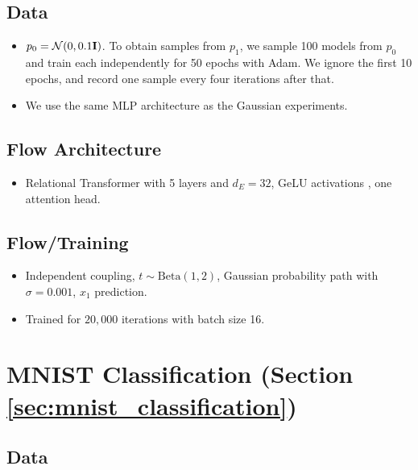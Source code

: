 \subsection*{Data}

\begin{itemize}
    \item $p_0 = \mathcal{N}(0, 0.1 \mathbf{I})$. To obtain samples from $p_1$, we sample 100 models from $p_0$ and train each independently for 50 epochs with Adam. We ignore the first 10 epochs, and record one sample every four iterations after that. 
    \item We use the same MLP architecture as the Gaussian experiments. 
\end{itemize}

{\color{orange}\subsection*{Flow Architecture}
\begin{itemize}
    \item Relational Transformer \citep{diaoRelationalAttentionGeneralizing2023,kofinasGraphNeuralNetworks2024} with 5 layers and $d_E = 32$, GeLU activations \citep{hendrycksGaussianErrorLinear2023a}, one attention head. 
\end{itemize}

\subsection*{Flow/Training}
\begin{itemize}
    \item Independent coupling, $t \sim \text{Beta}(1, 2)$, Gaussian probability path with $\sigma = 0.001$, $x_1$ prediction.
    \item Trained for $20,000$ iterations with batch size 16. 
\end{itemize}}


\section*{MNIST Classification (Section \ref{sec:mnist_classification})}

\subsection*{Data}



